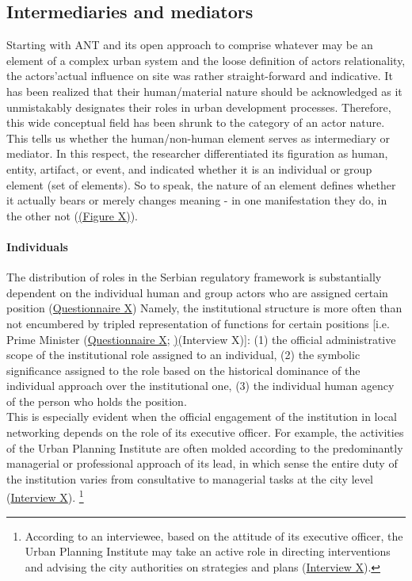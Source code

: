 \documentclass[11pt]{report}
\begin{document}
\subsection{Intermediaries and mediators}

Starting with ANT and its open approach to comprise whatever may be an element of a complex urban system and the loose definition of actors relationality, the actors’actual influence on site was rather straight-forward and indicative. It has been realized that their human/material nature should be acknowledged as it unmistakably designates their roles in urban development processes. Therefore, this wide conceptual field has been shrunk to the category of an actor nature. This tells us whether the human/non-human element serves as intermediary or mediator. In this respect, the researcher differentiated its figuration as human, entity, artifact, or event, and indicated whether it is an individual or group element (set of elements). So to speak, the nature of an element defines whether it actually bears or merely changes meaning - in one manifestation they do, in the other not (\href{Figure 5 ANT paper}{(Figure X)}).

\paragraph{Individuals}
The distribution of roles in the Serbian regulatory framework is substantially dependent on the individual human and group actors who are assigned certain position (\href{Questionnaire Experts Post-socialist}{Questionnaire X})
Namely, the institutional structure is more often than not encumbered by tripled representation of functions for certain positions [i.e. Prime Minister (\href{Questionnaire Experts Post-socialist}{Questionnaire X}; \href{Interview})({Interview X})]:
(1) the official administrative scope of the institutional role assigned to an individual,
(2) the symbolic significance assigned to the role based on the historical dominance of the individual approach over the institutional one,
(3) the individual human agency of the person who holds the position.
\\

This is especially evident when the official engagement of the institution in local networking depends on the role of its executive officer. For example, the activities of the Urban Planning Institute are often molded according to the predominantly managerial or professional approach of its lead, in which sense the entire duty of the institution varies from consultative to managerial tasks at the city level (\href{Annex}{Interview X}).
\footnote{
According to an interviewee, based on the attitude of its executive officer, the Urban Planning Institute may take an active role in directing interventions and advising the city authorities on strategies and plans (\href{InterviewX}{Interview X}).}
\\
\end{document}
